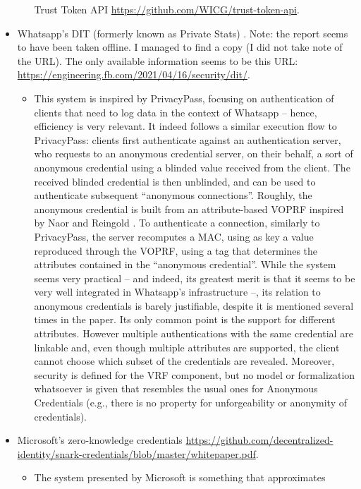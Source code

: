 \begin{itemize}
\begin{itemize}
    Trust Token API \url{https://github.com/WICG/trust-token-api}.
  \end{itemize}
\item Whatsapp's DIT (formerly known as Private Stats) \cite{hij+21}.
  Note: the report seems to have been taken offline. I managed to find a copy
  (I did not take note of the URL). The only available information seems
  to be this URL: \url{https://engineering.fb.com/2021/04/16/security/dit/}.
  \begin{itemize}
  \item This system is inspired by PrivacyPass, focusing on authentication of
    clients that need to log data in the context of Whatsapp -- hence,
    efficiency is very relevant. It indeed follows a similar execution flow to
    PrivacyPass: clients first authenticate against an authentication server,
    who requests to an anonymous credential server, on their behalf, a sort of
    anonymous credential using a blinded value received from the client. The
    received blinded credential is then unblinded, and can be used to authenticate
    subsequent ``anonymous connections''. Roughly, the anonymous credential is
    built from an attribute-based VOPRF inspired by Naor and Reingold
    \cite{nr04}. To authenticate a connection, similarly to PrivacyPass, the
    server recomputes a MAC, using as key a value reproduced through the VOPRF,
    using a tag that determines the attributes contained in the ``anonymous
    credential''. While the system seems very practical -- and indeed, its
    greatest merit is that it seems to be very well integrated in Whatsapp's
    infrastructure --, its relation to anonymous credentials is barely
    justifiable, despite it is mentioned several times in the paper. Its only
    common point is the support for different attributes. However multiple
    authentications with the same credential are linkable and, even though
    multiple attributes are supported, the client cannot choose which subset
    of the credentials are revealed. Moreover, security is defined for the
    VRF component, but no model or formalization whatsoever is given that
    resembles the usual ones for Anonymous Credentials (e.g., there is no
    property for unforgeability or anonymity of credentials).
  \end{itemize}
\item Microsoft's zero-knowledge credentials \url{https://github.com/decentralized-identity/snark-credentials/blob/master/whitepaper.pdf}.
  \begin{itemize}
  \item The system presented by Microsoft is something that approximates

\end{itemize}
\end{itemize}
